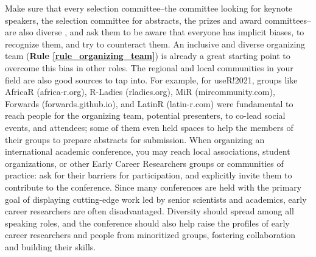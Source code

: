 \documentclass[10pt,letterpaper]{article}
\begin{document}
Make sure that every selection committee--the committee looking for keynote speakers, the selection committee for abstracts, the prizes and award committees--are also diverse \cite{swartzScienceValueDiversity2019, wongBuildDiversityScience2020}, and ask them to be aware that everyone has implicit biases, to recognize them, and try to counteract them. 
An inclusive and diverse organizing team (\textbf{Rule \ref{rule_organizing_team}}) is already a great starting point to overcome this bias in other roles. The regional and local communities in your field are also good sources to tap into. 
For example, for useR!2021, groups like AfricaR (africa-r.org), R-Ladies (rladies.org), MiR (mircommunity.com), Forwards (forwards.github.io), and LatinR (latin-r.com) were fundamental to reach people for the organizing team, potential presenters, to co-lead social events, and attendees; some of them even held spaces to help the members of their groups to prepare abstracts for submission.
When organizing an international academic conference, you may reach local associations, student organizations, or other Early Career Researchers groups or communities of practice: ask for their barriers for participation, and explicitly invite them to contribute to the conference. 
Since many conferences are held with the primary goal of displaying cutting-edge work led by senior scientists and academics, early career researchers are often disadvantaged. Diversity should spread among all speaking roles, and the conference should also help raise the profiles of early career researchers and people from minoritized groups, fostering collaboration and building their skills.
\end{document}
